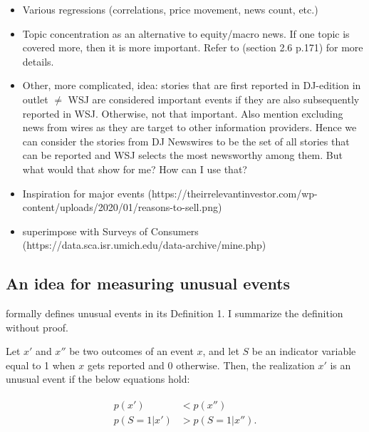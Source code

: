 \begin{itemize}
    \item Various regressions (correlations, price movement, news count, etc.)
    \item Topic concentration as an alternative to equity/macro news. If one topic is covered more, then it is more important. Refer to \textcite{Nimark2019} (section 2.6 p.171) for more details.
    \item Other, more complicated, idea: stories that are first reported in DJ-edition in outlet $\neq$ WSJ are considered important events if they are also subsequently reported in WSJ. Otherwise, not that important. Also \textcite{Nimark2019} mention excluding news from wires as they are target to other information providers. Hence we can consider the stories from DJ Newswires to be the set of all stories that can be reported and WSJ selects the most newsworthy among them. But what would that show for me? How can I use that?
    \item Inspiration for major events (https://theirrelevantinvestor.com/wp-content/uploads/2020/01/reasons-to-sell.png)
    \item superimpose with Surveys of Consumers (https://data.sca.isr.umich.edu/data-archive/mine.php)
\end{itemize}

\subsection{An idea for measuring unusual events}
\textcite{Nimark2014} formally defines unusual events in its Definition 1\footnotemark. I summarize the definition without proof.

\noindent Let $x'$ and $x''$ be two outcomes of an event $x$, and let $S$ be an indicator variable equal to 1 when $x$ gets reported and 0 otherwise. Then, the realization $x'$ is an unusual event if the below equations hold: 


\begin{align}
\begin{split}
p(x') &< p(x'') \\
p(S=1|x') &> p(S=1|x''). \nonumber
\end{split}
\end{align}

